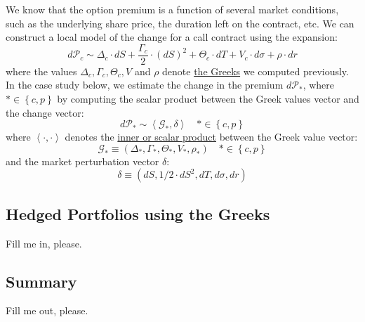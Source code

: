 \documentclass[11pt]{article}
\theoremstyle{definition}
\begin{document}
We know that the option premium is a function of several market conditions, such as the underlying share price, the duration left on the contract, etc. We can construct a local model of the change for a call contract using the expansion:
\begin{equation}
d\mathcal{P}_{c} \sim \Delta_{c}\cdot{d}{S}+\frac{\Gamma_{c}}{2}\cdot\left(d{S}\right)^2 + \Theta_{c}\cdot{d}{T}+V_{c}\cdot{d}\sigma + \rho\cdot{d}{r}
\end{equation}
where the values $\Delta_{c}, \Gamma_{c},  \Theta_{c}, V$ and $\rho$ denote \href{https://en.wikipedia.org/wiki/en:Greeks_(finance)?variant=zh-tw}{the Greeks} we computed previously. In the case study below, we estimate the change in the premium $d\mathcal{P}_{*}$, where $*\in\left\{c,p\right\}$ by computing the scalar product between the Greek values vector and the change vector:
\begin{equation}
d\mathcal{P}_{*}\sim\left<\mathcal{G}_{*},\delta\right>\quad{*\in\left\{c,p\right\}}
\end{equation}
where $\left<\cdot,\cdot\right>$ denotes the \href{https://en.wikipedia.org/wiki/Inner_product_space}{inner or scalar product} between the Greek value vector:
\begin{equation}
\mathcal{G}_{*}\equiv\left(\Delta_{*},\Gamma_{*},\Theta_{*},V_{*},\rho_{*}\right)\quad{*\in\left\{c,p\right\}}
\end{equation}
and the market perturbation vector $\delta$:
\begin{equation}
\delta\equiv\left(dS,1/2\cdot{dS}^{2},dT,d\sigma,dr\right)
\end{equation}

\subsection{Hedged Portfolios using the Greeks}
Fill me in, please.

\subsection*{Summary}
Fill me out, please.

\clearpage


\clearpage
\printindex
\end{document}
